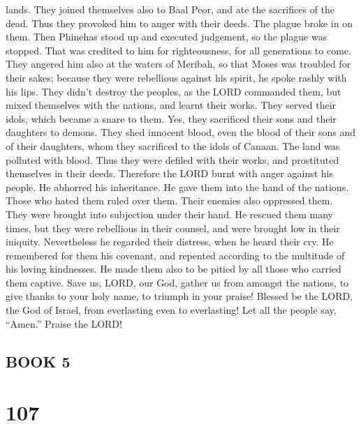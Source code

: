 lands.  They joined themselves also to Baal Peor, and ate
the sacrifices of the dead.  Thus they provoked him to
anger with their deeds. The plague broke in on them.  Then
Phinehas stood up and executed judgement, so the plague was stopped.
 That was credited to him for righteousness, for all
generations to come.  They angered him also at the waters
of Meribah, so that Moses was troubled for their sakes; 
because they were rebellious against his spirit, he spoke rashly with
his lips.  They didn't destroy the peoples, as the LORD
commanded them,  but mixed themselves with the nations, and
learnt their works.  They served their idols, which became
a snare to them.  Yes, they sacrificed their sons and their
daughters to demons.  They shed innocent blood, even the
blood of their sons and of their daughters, whom they sacrificed to the
idols of Canaan. The land was polluted with blood.  Thus
they were defiled with their works, and prostituted themselves in their
deeds.  Therefore the LORD burnt with anger against his
people. He abhorred his inheritance.  He gave them into the
hand of the nations. Those who hated them ruled over them. 
Their enemies also oppressed them. They were brought into subjection
under their hand.  He rescued them many times, but they
were rebellious in their counsel, and were brought low in their
iniquity.  Nevertheless he regarded their distress, when he
heard their cry.  He remembered for them his covenant, and
repented according to the multitude of his loving kindnesses.
 He made them also to be pitied by all those who carried
them captive.  Save us, LORD, our God, gather us from
amongst the nations, to give thanks to your holy name, to triumph in
your praise!  Blessed be the LORD, the God of Israel, from
everlasting even to everlasting! Let all the people say, ``Amen.''
Praise the LORD!

\hypertarget{book-5}{%
\subsection{BOOK 5}\label{book-5}}

\hypertarget{section-99}{%
\section{107}\label{section-99}}

